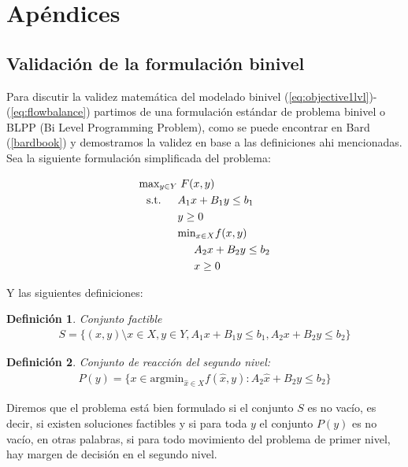 \documentclass{article}
\newtheorem{definition}{Definición}
\newcommand{\modelspace}{\hspace{1.5em}}
\begin{document}
  \section{Apéndices}

  \subsection{Validación de la formulación binivel}
  \label{sect:apendixbilevelvalidation}

  Para discutir la validez matemática del modelado binivel (\ref{eq:objective1lvl})-(\ref{eq:flowbalance}) partimos de una formulación estándar de problema binivel o BLPP (Bi Level Programming Problem), como se puede encontrar en Bard (\ref{bardbook}) y demostramos la validez en base a las definiciones ahi mencionadas.
  Sea la siguiente formulación simplificada del problema:

  \begin{align}
    \text{max}_{y \in Y}    & \; F(x, y) \label{bilevelgeneric1} \\
    \text{s.t.} \modelspace & A_1 x + B_1 y \leq b_1 \\
                            & y \geq 0 \\
                            & \text{min}_{x \in X} f(x, y) \\
                            & \modelspace A_2 x + B_2 y \leq b_2 \label{bilevelgeneric5} \\
                            & \modelspace x \geq 0 \label{bilevelgeneric6}
  \end{align}

  Y las siguientes definiciones:

  \begin{definition}
    Conjunto factible
    \begin{align}
      S = \{(x, y) \setminus x \in X, y \in Y, A_1 x + B_1 y \leq b_1, A_2 x + B_2 y \leq b_2 \}
    \end{align}
  \end{definition}

  \begin{definition}
    Conjunto de reacción del segundo nivel:
    \begin{align}
      P(y) = \{ x \in \text{argmin}_{\hat{x} \in X} f(\hat{x}, y) : A_2 \hat{x} + B_2 y \leq b_2 \}
    \end{align}
  \end{definition}

  Diremos que el problema está bien formulado si el conjunto $S$ es no vacío, es decir, si existen soluciones factibles y si para toda $y$ el conjunto $P(y)$ es no vacío, en otras palabras, si para todo movimiento del problema de primer nivel, hay margen de decisión en el segundo nivel.
\end{document}
